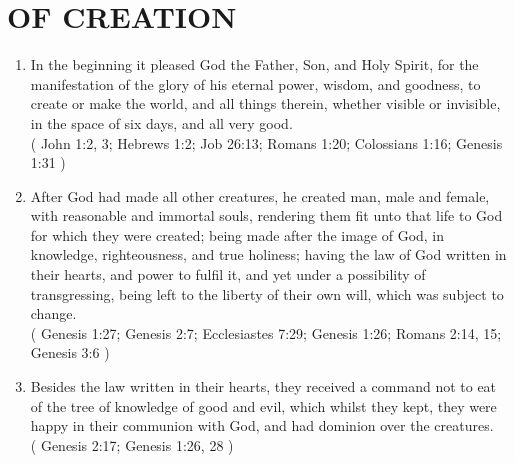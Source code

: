 \documentclass[12pt,a4paper]{book}
\begin{document}
\chapter{OF CREATION}
\label{ch-crea}
\begin{enumerate}
\item
\label{ch-crea-1}
In the beginning it pleased God the Father, Son, and Holy Spirit, for the manifestation of the glory of his eternal power, wisdom, and goodness, to create or make the world, and all things therein, whether visible or invisible, in the space of six days, and all very good.\\
( John 1:2, 3; Hebrews 1:2; Job 26:13; Romans 1:20; Colossians 1:16; Genesis 1:31 )
\item
\label{ch-crea-2}
After God had made all other creatures, he created man, male and female, with reasonable and immortal souls, rendering them fit unto that life to God for which they were created; being made after the image of God, in knowledge, righteousness, and true holiness; having the law of God written in their hearts, and power to fulfil it, and yet under a possibility of transgressing, being left to the liberty of their own will, which was subject to change.\\
( Genesis 1:27; Genesis 2:7; Ecclesiastes 7:29; Genesis 1:26; Romans 2:14, 15; Genesis 3:6 )
\item
\label{ch-crea-3}
Besides the law written in their hearts, they received a command not to eat of the tree of knowledge of good and evil, which whilst they kept, they were happy in their communion with God, and had dominion over the creatures.\\
( Genesis 2:17; Genesis 1:26, 28 )
\end{enumerate}
\end{document}
